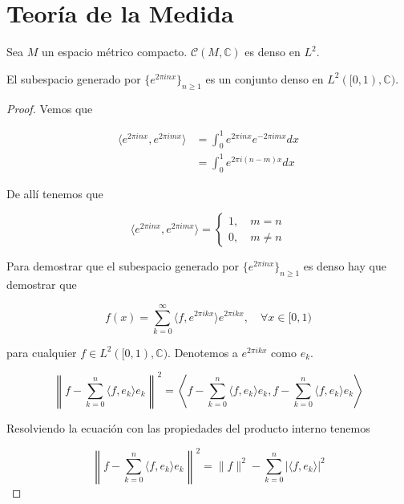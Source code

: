 \section{Teoría de la Medida}

\begin{teorema}
	Sea $M$ un espacio métrico compacto. $\mathcal{C}(M,\mathbb{C})$ es denso en $L^2$.
\end{teorema}

\begin{teorema}
	El subespacio generado por $\{e^{2\pi inx}\}_{n \geq 1}$ es un conjunto denso en $L^2([0,1),\mathbb{C})$.
\end{teorema}

\begin{proof}
	Vemos que
	
	\begin{align}
		\langle e^{2\pi inx},e^{2\pi imx} \rangle &= \int_{0}^{1} e^{2\pi inx} e^{-2\pi imx} dx\\
		&= \int_{0}^{1} e^{2\pi i(n-m)x} dx
	\end{align}
	
	De allí tenemos que
	
	\begin{equation}
		\langle e^{2\pi inx},e^{2\pi imx} \rangle = \begin{cases}
			1, \quad m=n\\			
			0,\quad m \neq n
		\end{cases}
	\end{equation}
	
	Para demostrar que el subespacio generado por $\{e^{2\pi inx}\}_{n \geq 1}$ es denso hay que demostrar que
	
	\begin{equation}
		f(x) = \sum_{k=0}^{\infty} \langle f,e^{2\pi ikx} \rangle e^{2\pi ikx}, \quad \forall x \in [0,1)
	\end{equation}
	
	para cualquier $f \in L^2([0,1),\mathbb{C})$. Denotemos a $e^{2\pi ikx}$ como $e_k$.
	
	\begin{equation}
		\left\| f - \sum_{k=0}^{n} \langle f,e_k \rangle e_k \right\|^2 = \left\langle f - \sum_{k=0}^{n} \langle f,e_k \rangle e_k, f - \sum_{k=0}^{n} \langle f,e_k \rangle e_k \right\rangle
	\end{equation}
	
	Resolviendo la ecuación con las propiedades del producto interno tenemos
	
	\begin{equation}
		\left\| f - \sum_{k=0}^{n} \langle f,e_k \rangle e_k \right\|^2 = \|f\|^2 - \sum_{k=0}^{n} |\langle f,e_k \rangle|^2
	\end{equation}
	

\end{proof}
